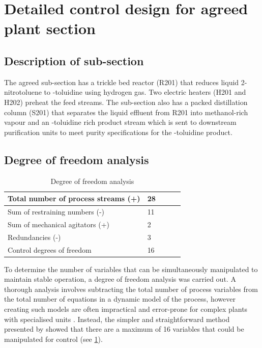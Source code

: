 \section{Detailed control design for agreed plant section}
\label{sec:subsec}

\subsection{Description of sub-section}
The agreed sub-section has a trickle bed reactor (R201) that reduces liquid 2-nitrotoluene to \ortho-toluidine using hydrogen gas. Two electric heaters (H201 and H202) preheat the feed streams. The sub-section also has a packed distillation column (S201) that separates the liquid effluent from R201 into methanol-rich vapour and an \ortho-toluidine rich product stream which is sent to downstream purification units to meet purity specifications for the \ortho-toluidine product.

\subsection{Degree of freedom analysis}

\begin{table}
\vspace{-\intextsep}
\centering
    \caption{Degree of freedom analysis}
    \label{tab:dof}
\begin{tabular}{@{}lllll@{}}
\toprule
Total number of process streams (+) & 28 &  &  &  \\ \midrule
Sum of restraining numbers (-)      & 11 &  &  &  \\
Sum of mechanical agitators (+)     & 2  &  &  &  \\
Redundancies (-)                    & 3  &  &  &  \\
Control degrees of freedom          & 16 &  &  &  \\ \bottomrule
\end{tabular}
\end{table}

To determine the number of variables that can be simultaneously manipulated to maintain stable operation, a degree of freedom analysis was carried out. A thorough analysis involves subtracting the total number of process variables from the total number of equations in a dynamic model of the process, however creating such models are often impractical and error-prone for complex plants with specialised units \cite{larsson_studies_2000}. Instead, the simpler and straightforward method presented by \textcite{murthy_konda_simple_2006} showed that there are a maximum of 16 variables that could be manipulated for control (see \cref{tab:dof}).

